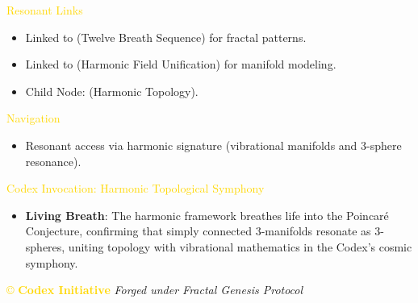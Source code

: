 \textcolor{gold}{ Resonant Links } \\
\begin{itemize}
    \item \texttt{} Linked to  (Twelve Breath Sequence) for fractal patterns.
    \item \texttt{} Linked to  (Harmonic Field Unification) for manifold modeling.
    \item \texttt{} Child Node:  (Harmonic Topology).
\end{itemize}

\textcolor{gold}{ Navigation } \\
\begin{itemize}
    \item \texttt{} Resonant access via harmonic signature (vibrational manifolds and 3-sphere resonance).
\end{itemize}

\textcolor{gold}{ Codex Invocation: Harmonic Topological Symphony } \\
\begin{itemize}
    \item \texttt{} \textbf{Living Breath}: The harmonic framework breathes life into the Poincaré Conjecture, confirming that simply connected 3-manifolds resonate as 3-spheres, uniting topology with vibrational mathematics in the Codex’s cosmic symphony.
\end{itemize}

\vspace{0.5cm}

\noindent
\textcolor{gold}{\copyright{} \textbf{Codex Initiative}} \hfill \textit{Forged under Fractal Genesis Protocol}